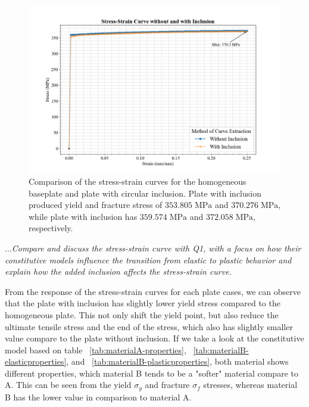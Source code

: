 \documentclass[12pt]{article}
\begin{document}
\begin{figure}[H]
    \centering
    \includegraphics[width=1\textwidth]{visualize_tensileGraph/res/comparison_inclusion_non.png}
    \caption{Comparison of the stress-strain curves for the homogeneous baseplate and plate with circular
    inclusion. Plate with inclusion produced yield and fracture stress of $353.805 \; \text{MPa}$ and $370.276\; \text{MPa}$,
    while plate with inclusion has $359.574\; \text{MPa}$ and $372.058\; \text{MPa}$, respectively.}
    \label{fig:ComparisonInclusion}
\end{figure}


\textit{$\dots$Compare and discuss the stress-strain curve with Q1, with a focus on how their constitutive
models influence the transition from elastic to plastic behavior and explain how the added
inclusion affects the stress-strain curve.}
\vspace{1em}


\hspace{2em}From the response of the stress-strain curves for each plate cases, we can observe that the plate with inclusion
has slightly lower yield stress compared to the homogeneous plate. This not only shift the yield point, but also reduce the ultimate tensile 
stress and the end of the stress, which also has slightly smaller value compare to the plate without inclusion. If we take a look at the
constitutive model based on table ~\ref{tab:materialA-properties}, ~\ref{tab:materialB-elasticproperties}, and ~\ref{tab:materialB-plasticproperties},
both material shows different properties, which material B tends to be a "softer" material compare to A. This can be seen from the yield $\sigma_{y}$ 
and fracture $\sigma_{f}$ stresses, whereas material B has the lower value in comparison to material A. 
\end{document}
